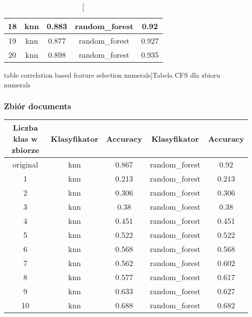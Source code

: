 \documentclass{classrep}
\begin{document}
{{{\begin{table}[!htbp]
\begin{tabular}{|c|c|c|c|c|}
                        18 & knn & 0.883 & random\_forest & 0.92 \\ \hline
                        19 & knn & 0.877 & random\_forest & 0.927 \\ \hline
                        20 & knn & 0.898 & random\_forest & 0.935 \\ \hline
                    \end{tabular}
                    \caption
                    [table correlation based feature selection numerals]{Tabela CFS dla
                    zbioru numerals}
                    \label{table_correlation_based_feature_selection_numerals}
                \end{table}
                \FloatBarrier
            }
            \subsubsection{Zbiór documents} {
                \begin{table}[!htbp]
                    \centering
                    \begin{tabular}{|c|c|c|c|c|}
                        \hline
                        Liczba klas w zbiorze & Klasyfikator & Accuracy & Klasyfikator & Accuracy \\ \hline
                        original & knn & 0.867 & random\_forest & 0.92 \\ \hline
                        1 & knn & 0.213 & random\_forest & 0.213 \\ \hline
                        2 & knn & 0.306 & random\_forest & 0.306 \\ \hline
                        3 & knn & 0.38 & random\_forest & 0.38 \\ \hline
                        4 & knn & 0.451 & random\_forest & 0.451 \\ \hline
                        5 & knn & 0.522 & random\_forest & 0.522 \\ \hline
                        6 & knn & 0.568 & random\_forest & 0.568 \\ \hline
                        7 & knn & 0.562 & random\_forest & 0.602 \\ \hline
                        8 & knn & 0.577 & random\_forest & 0.617 \\ \hline
                        9 & knn & 0.633 & random\_forest & 0.627 \\ \hline
                        10 & knn & 0.688 & random\_forest & 0.682 \\ \hline

\end{tabular}
\end{table}}}}
\end{document}
